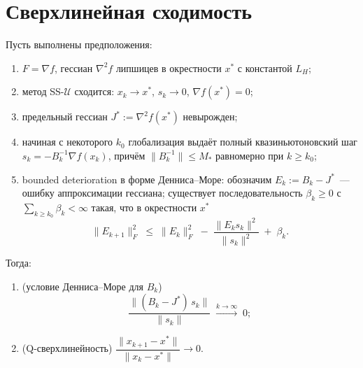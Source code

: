 \section{Сверхлинейная сходимость}\label{sec:ss_superlinear}

\begin{theorem}
\label{thm:ss_dm}
Пусть выполнены предположения:
\begin{enumerate}
  \item[\textup{(H1)}] $F = \nabla f$, гессиан $\nabla^2 f$ липшицев в окрестности
    $x^*$ с константой $L_H$;
  \item[\textup{(H2)}] метод SS-$\mathcal{U}$ сходится: $x_k \to x^*$, $s_k \to 0$,
    $\nabla f(x^*) = 0$;
  \item[\textup{(H3)}] предельный гессиан $J^* := \nabla^2 f(x^*)$ невырожден;
  \item[\textup{(H4)}] начиная с некоторого $k_0$ глобализация выдаёт полный
    квазиньютоновский шаг $s_k = -B_k^{-1}\nabla f(x_k)$, причём
    $\|B_k^{-1}\| \le M_*$ равномерно при $k \ge k_0$;
  \item[\textup{(H5)}] bounded deterioration в форме Денниса--Море:
    обозначим $E_k := B_k - J^*$~--- ошибку аппроксимации гессиана;
    существует последовательность $\beta_k \ge 0$ с
    $\sum_{k\ge k_0}\beta_k < \infty$ такая, что в окрестности $x^*$
    \[
      \|E_{k+1}\|_F^2 \;\le\; \|E_k\|_F^2 \;-\; \frac{\|E_k s_k\|^2}{\|s_k\|^2}
                          \;+\; \beta_k.
    \]
\end{enumerate}
Тогда:
\begin{enumerate}
  \item \textup{(условие Денниса--Море для $B_k$)}
    \[
      \frac{\|(B_k - J^*)\, s_k\|}{\|s_k\|} \;\xrightarrow{k\to\infty}\; 0;
    \]
  \item \textup{(Q-сверхлинейность)}
    $\dfrac{\|x_{k+1} - x^*\|}{\|x_k - x^*\|} \to 0$.
\end{enumerate}
\end{theorem}

